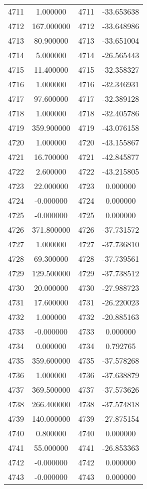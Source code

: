 \documentclass[12pt]{article}
\begin{document}
\begin{longtable}{@{}cccc@{}}
4711 & 1.000000 & 4711 & -33.653638 \\
4712 & 167.000000 & 4712 & -33.648986 \\
4713 & 80.900000 & 4713 & -33.651004 \\
4714 & 5.000000 & 4714 & -26.565443 \\
4715 & 11.400000 & 4715 & -32.358327 \\
4716 & 1.000000 & 4716 & -32.346931 \\
4717 & 97.600000 & 4717 & -32.389128 \\
4718 & 1.000000 & 4718 & -32.405786 \\
4719 & 359.900000 & 4719 & -43.076158 \\
4720 & 1.000000 & 4720 & -43.155867 \\
4721 & 16.700000 & 4721 & -42.845877 \\
4722 & 2.600000 & 4722 & -43.215805 \\
4723 & 22.000000 & 4723 & 0.000000 \\
4724 & -0.000000 & 4724 & 0.000000 \\
4725 & -0.000000 & 4725 & 0.000000 \\
4726 & 371.800000 & 4726 & -37.731572 \\
4727 & 1.000000 & 4727 & -37.736810 \\
4728 & 69.300000 & 4728 & -37.739561 \\
4729 & 129.500000 & 4729 & -37.738512 \\
4730 & 20.000000 & 4730 & -27.988723 \\
4731 & 17.600000 & 4731 & -26.220023 \\
4732 & 1.000000 & 4732 & -20.885163 \\
4733 & -0.000000 & 4733 & 0.000000 \\
4734 & 0.000000 & 4734 & 0.792765 \\
4735 & 359.600000 & 4735 & -37.578268 \\
4736 & 1.000000 & 4736 & -37.638879 \\
4737 & 369.500000 & 4737 & -37.573626 \\
4738 & 266.400000 & 4738 & -37.574818 \\
4739 & 140.000000 & 4739 & -27.875154 \\
4740 & 0.800000 & 4740 & 0.000000 \\
4741 & 55.000000 & 4741 & -26.853363 \\
4742 & -0.000000 & 4742 & 0.000000 \\
4743 & -0.000000 & 4743 & 0.000000 \\

\end{longtable}
\end{document}
